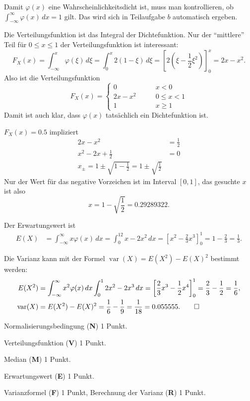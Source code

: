 \begin{loesung}
\begin{teilaufgaben}
\item Damit $\varphi(x)$ eine Wahrscheinlichkeitsdicht ist, muss man 
kontrollieren, ob $\int_{-\infty}^\infty\varphi(x)\,dx=1$ gilt. Das
wird sich in Teilaufgabe $b$ automatisch ergeben.
\item Die Verteilungsfunktion ist das Integral der Dichtefunktion.
Nur der ``mittlere'' Teil für $0\le x\le 1$
der Verteilungsfunktion ist interessant:
\[
F_X(x)=\int_{-\infty}^x\varphi(\xi)\,d\xi =\int_0^x2(1-\xi)\,d\xi=
\left[2(\xi-\frac12\xi^2)\right]_0^x=2x-x^2.
\]
Also ist die Verteilungsfunktion
\[
F_X(x)=\begin{cases}
     0&\qquad x < 0\\
2x-x^2&\qquad 0\le x < 1\\
     1&\qquad x \ge 1
\end{cases}
\]
Damit ist auch klar, dass $\varphi(x)$ tatsächlich ein Dichtefunktion ist.
\item $F_X(x)=0.5$ impliziert
\begin{align*}
2x-x^2&=\frac12\\
x^2-2x+\frac12&=0\\
x_\pm=1\pm\sqrt{1-\frac12}=1\pm\sqrt{\frac12}
\end{align*}
Nur der Wert für das negative Vorzeichen ist im Interval $[0,1]$, das gesuchte
$x$ ist also
\[
x=1-\sqrt{\frac12}=0.29289322.
\]
\item
Der Erwartungswert ist
\begin{align*}
E(X)&=\int_{-\infty}^{\infty}x\varphi(x)\,dx
=\int_0^12x-2x^2\,dx=\left[ x^2-\frac23x^3\right]_0^1=1-\frac23=\frac13.
\end{align*}
\item Die Varianz kann mit der Formel
$\operatorname{var}(X)=E(X^2)-E(X)^2$ bestimmt werden:
\begin{align*}
E(X^2)&=\int_{-\infty}^{\infty}x^2\varphi(x)\,dx
\int_0^1 2x^2-2x^3\,dx
=\left[\frac23x^3-\frac12x^4\right]_0^1
=\frac23-\frac12=\frac16,
\\
\operatorname{var}(X)&=E(X^2)-E(X)^2=\frac16 - \frac19=\frac1{18}=0.055555.
\qedhere
\end{align*}
\end{teilaufgaben}
\end{loesung}

\begin{bewertung}
\begin{teilaufgaben}
\item Normalisierungsbedingung ({\bf N}) 1 Punkt.
\item Verteilungsfunktion ({\bf V}) 1 Punkt.
\item Median ({\bf M}) 1 Punkt.
\item Erwartungswert ({\bf E}) 1 Punkt.
\item Varianzformel ({\bf F}) 1 Punkt, Berechnung der Varianz ({\bf R}) 1 Punkt.
\end{teilaufgaben}
\end{bewertung}

